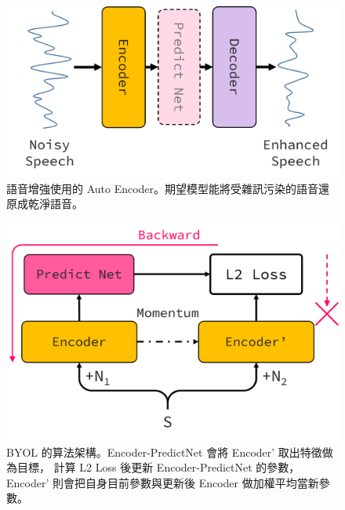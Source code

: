 \documentclass[10pt,twocolumn,letterpaper]{article}
\begin{document}
\begin{CJK}{UTF8}{bkai}
   \begin{figure}[t]
      \begin{center}
         \includegraphics[width=1\linewidth]{img/auto-encoder.png}
      \end{center}
      \caption{
         語音增強使用的 Auto Encoder。期望模型能將受雜訊污染的語音還原成乾淨語音。
      }
      \label{fig:long}
      \label{fig:onecol}
   \end{figure}

   \begin{figure}[t]
      \begin{center}
         \includegraphics[width=1\linewidth]{img/BYOL.png}
      \end{center}
      \caption{
         BYOL 的算法架構。Encoder-PredictNet 會將 Encoder' 取出特徵做為目標，
         計算 L2 Loss 後更新 Encoder-PredictNet 的參數，
         Encoder' 則會把自身目前參數與更新後 Encoder 做加權平均當新參數。
      }
      \label{fig:long}
      \label{fig:onecol}
   \end{figure}


\end{CJK}
\end{document}
